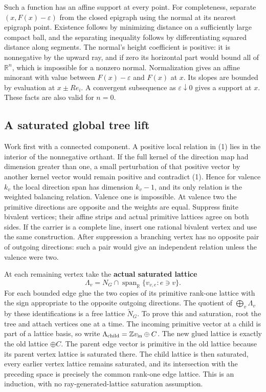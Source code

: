 \documentclass[
  11pt,
]{article}
\begin{document}
Such a function has an affine support at every point. For completeness,
separate \((x,F(x)-\varepsilon)\) from the closed epigraph using the
normal at its nearest epigraph point. Existence follows by minimizing
distance on a sufficiently large compact ball, and the separating
inequality follows by differentiating squared distance along segments.
The normal's height coefficient is positive: it is nonnegative by the
upward ray, and if zero its horizontal part would bound all of
\(\mathbb R^n\), which is impossible for a nonzero normal. Normalization
gives an affine minorant with value between \(F(x)-\varepsilon\) and
\(F(x)\) at \(x\). Its slopes are bounded by evaluation at
\(x\pm Re_i\). A convergent subsequence as \(\varepsilon\downarrow0\)
gives a support at \(x\). These facts are also valid for \(n=0\).

\subsection{A saturated global tree
lift}\label{a-saturated-global-tree-lift}

Work first with a connected component. A positive local relation in (1)
lies in the interior of the nonnegative orthant. If the full kernel of
the direction map had dimension greater than one, a small perturbation
of that positive vector by another kernel vector would remain positive
and contradict (1). Hence for valence \(k_v\) the local direction span
has dimension \(k_v-1\), and its only relation is the weighted balancing
relation. Valence one is impossible. At valence two the primitive
directions are opposite and the weights are equal. Suppress finite
bivalent vertices; their affine strips and actual primitive lattices
agree on both sides. If the carrier is a complete line, insert one
rational bivalent vertex and use the same construction. After
suppression a branching vertex has no opposite pair of outgoing
directions: such a pair would give an independent relation unless the
valence were two.

At each remaining vertex take the \textbf{actual saturated lattice}
\[\Lambda_v=N_G\cap\operatorname{span}_{\mathbb R}\{v_{v,e}:e\ni v\}.\]
For each bounded edge glue the two copies of its primitive rank-one
lattice with the sign appropriate to the opposite outgoing directions.
The quotient of \(\bigoplus_v\Lambda_v\) by these identifications is a
free lattice \(\widetilde N_G\). To prove this and saturation, root the
tree and attach vertices one at a time. The incoming primitive vector at
a child is part of a lattice basis, so write
\(\Lambda_{\rm child}=\mathbb Z v_{\rm in}\oplus C\). The new glued
lattice is exactly the old lattice \(\oplus C\). The parent edge vector
is primitive in the old lattice because its parent vertex lattice is
saturated there. The child lattice is then saturated, every earlier
vertex lattice remains saturated, and its intersection with the
preceding space is precisely the common rank-one edge lattice. This is
an induction, with no ray-generated-lattice saturation assumption.
\end{document}
